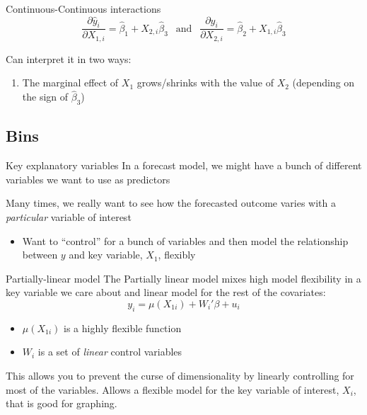 \documentclass[aspectratio=169,t,11pt,table]{beamer}
\begin{document}
\begin{frame}{Continuous-Continuous interactions}
  $$
    \frac{\partial \hat{y}_i}{\partial X_{1,i}} = \hat{\beta}_1 + X_{2,i} \hat{\beta}_3 
    \ \ \text{ and }\ \ 
    \frac{\partial \hat{y}_i}{\partial X_{2,i}} = \hat{\beta}_2 + X_{1,i} \hat{\beta}_3
  $$

  \bigskip
  Can interpret it in two ways:
  \begin{enumerate}
    \item The marginal effect of $X_{1}$ grows/shrinks with the value of $X_{2}$ (depending on the sign of $\hat{\beta}_3$)
  \end{enumerate}
\end{frame}

\subsection{Bins}

\begin{frame}{Key explanatory variables}
  In a forecast model, we might have a bunch of different variables we want to use as predictors

  \bigskip
  Many times, we really want to see how the forecasted outcome varies with a \emph{particular} variable of interest
  \begin{itemize}
    \item Want to ``control'' for a bunch of variables and then model the relationship between $y$ and key variable, $X_1$, flexibly
  \end{itemize}
\end{frame}

\begin{frame}{Partially-linear model}
  The \alert{Partially linear model} mixes high model flexibility in a key variable we care about and linear model for the rest of the covariates:
  $$
    y_i = \mu(X_{1i}) + W_i' \beta + u_i
  $$
  \vspace*{-\bigskipamount}
  \begin{itemize}
    \item $\mu(X_{1i})$ is a highly flexible function
    \item $W_i$ is a set of \emph{linear} control variables
  \end{itemize}

  \bigskip
  This allows you to prevent the curse of dimensionality by linearly controlling for most of the variables. 
  Allows a flexible model for the key variable of interest, $X_i$, that is good for graphing.
\end{frame}
\end{document}
